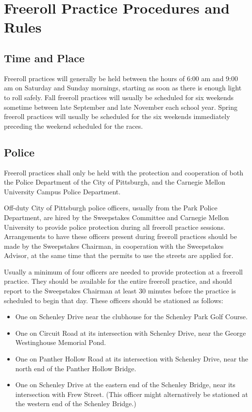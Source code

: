 \section{Freeroll Practice Procedures and Rules}

\subsection{Time and Place}

	Freeroll practices will generally be held between the hours of 6:00 am and
	9:00 am on Saturday and Sunday mornings, starting as soon as there is enough
	light to roll safely.  Fall freeroll practices will usually be scheduled for
	six weekends sometime between late September and late November each school
	year. Spring freeroll practices will usually be scheduled for the six weekends
	immediately preceding the weekend scheduled for the races.

\subsection{Police}

	Freeroll practices shall only be held with the protection and cooperation of
	both the Police Department of the City of Pittsburgh, and the Carnegie Mellon
	University Campus Police Department.

	Off-duty City of Pittsburgh police officers, usually from the Park Police
	Department, are hired by the Sweepstakes Committee and Carnegie Mellon
	University to provide police protection during all freeroll practice sessions.
	Arrangements to have these officers present during freeroll practices should be
	made by the Sweepstakes Chairman, in cooperation with the Sweepstakes Advisor,
	at the same time that the permits to use the streets are applied for.

	Usually a minimum of four officers are needed to provide protection at a
	freeroll practice. They should be available for the entire freeroll practice,
	and should report to the Sweepstakes Chairman at least 30 minutes before the
	practice is scheduled to begin that day. These officers should be stationed as
	follows:

	\begin{itemize}

		\item One on Schenley Drive near the clubhouse for the Schenley Park Golf
		Course.

		\item One on Circuit Road at its intersection with Schenley Drive, near the
		George Westinghouse Memorial Pond.

		\item One on Panther Hollow Road at its intersection with Schenley Drive,
		near the north end of the Panther Hollow Bridge.

		\item One on Schenley Drive at the eastern end of the Schenley Bridge, near
		its intersection with Frew Street. (This officer might alternatively be
		stationed at the western end of the Schenley Bridge.)

	\end{itemize}

